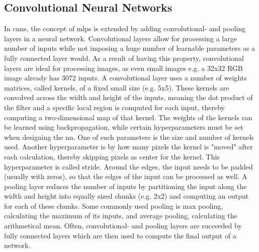 \subsection{Convolutional Neural Networks}
In \ac{cnn}s, the concept of \ac{mlp}s is extended by adding convolutional- and pooling layers in a neural network. Convolutional layers allow for processing a large number of inputs while not imposing a huge number of learnable parameters as a fully connected layer would. As a result of having this property, convolutional layers are ideal for processing images, as even small images e.g. a 32x32 RGB image already has 3072 inputs.
A convolutional layer uses a number of weights matrices, called kernels, of a fixed small size (e.g. 5x5). These kernels are convolved across the width and height of the inputs, meaning the dot product of the filter and a specific local region is computed for each input, thereby computing a two-dimensional map of that kernel. The weights of the kernels can be learned using backpropagation, while certain hyperparameters must be set when designing the \ac{nn}. One of such parameters is the size and number of kernels used. Another hyperparameter is by how many pixels the kernel is "moved" after each calculation, thereby skipping pixels as center for the kernel. This hyperparameter is called stride. Around the edges, the input needs to be padded (usually with zeros), so that the edges of the input can be processed as well.
A pooling layer reduces the number of inputs by partitioning the input along the width and height into equally sized chunks (e.g. 2x2) and computing an output for each of these chunks. Some commonly used pooling is max pooling, calculating the maximum of its inputs, and average pooling, calculating the arithmetical mean.
Often, convolutional- and pooling layers are succeeded by fully connected layers which are then used to compute the final output of a network.




%


